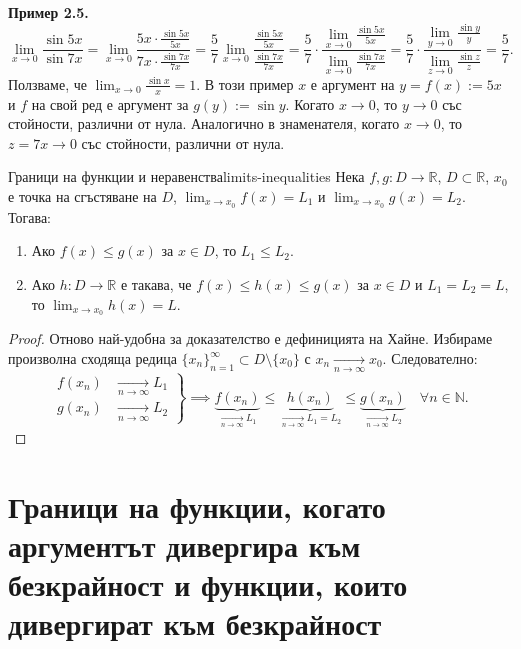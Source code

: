 \noindent\textbf{Пример 2.5.}
\[
\lim_{x \to 0} \frac{\sin 5x}{\sin 7x} = \lim_{x \to 0} \frac{5x \cdot \frac{\sin 5x}{5x}}{7x \cdot \frac{\sin 7x}{7x}} = \frac{5}{7} \lim_{x \to 0} \frac{\frac{\sin 5x}{5x}}{\frac{\sin 7x}{7x}} = \frac{5}{7} \cdot \frac{\lim_{x \to 0} \frac{\sin 5x}{5x}}{\lim_{x \to 0} \frac{\sin 7x}{7x}} = \frac{5}{7} \cdot \frac{\lim_{y \to 0} \frac{\sin y}{y}}{\lim_{z \to 0} \frac{\sin z}{z}} = \frac{5}{7}.
\]
Ползваме, че $\lim_{x \to 0} \frac{\sin x}{x} = 1$. В този пример $x$ е аргумент на $y = f(x) := 5x$ и $f$ на свой ред е аргумент за $g(y) := \sin y$. Когато $x \to 0$, то $y \to 0$ със стойности, различни от нула. Аналогично в знаменателя, когато $x \to 0$, то $z = 7x \to 0$ със стойности, различни от нула.

\begin{theorem}{Граници на функции и неравенства}{limits-inequalities}
Нека $f, g : D \to \mathbb{R}$, $D \subset \mathbb{R}$, $x_0$ е точка на сгъстяване на $D$, $\lim_{x \to x_0} f(x) = L_1$ и $\lim_{x \to x_0} g(x) = L_2$. Тогава:
\begin{enumerate}
    \item[(а)] Ако $f(x) \le g(x)$ за $x \in D$, то $L_1 \le L_2$.
    \item[(б)] Ако $h : D \to \mathbb{R}$ е такава, че $f(x) \le h(x) \le g(x)$ за $x \in D$ и $L_1 = L_2 = L$, то $\lim_{x \to x_0} h(x) = L$.
\end{enumerate}
\end{theorem}

\begin{proof}
Отново най-удобна за доказателство е дефиницията на Хайне. Избираме произволна сходяща редица $\{x_n\}_{n=1}^{\infty} \subset D \setminus \{x_0\}$ с $x_n \xrightarrow[n \to \infty]{} x_0$. Следователно:
\[
\left.
\begin{aligned}
f(x_n) &\xrightarrow[n \to \infty]{} L_1 \\
g(x_n) &\xrightarrow[n \to \infty]{} L_2
\end{aligned}
\right\} \implies 
\underbrace{f(x_n)}_{\xrightarrow[n \to \infty]{} L_1} \le \underbrace{h(x_n)}_{\xrightarrow[n \to \infty]{} L_1 = L_2} \le \underbrace{g(x_n)}_{\xrightarrow[n \to \infty]{} L_2} \quad \forall n \in \mathbb{N}.
\]
\end{proof}

\section{Граници на функции, когато аргументът дивергира към безкрайност и функции, които дивергират към безкрайност}

